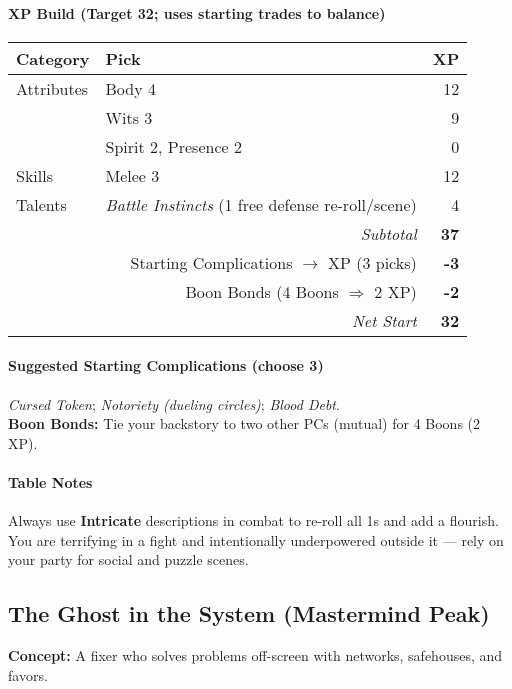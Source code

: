 \documentclass[11pt]{book}
\begin{document}
\paragraph{XP Build (Target 32; uses starting trades to balance)}
\begin{tabular}{@{}llr@{}}
\toprule
\textbf{Category} & \textbf{Pick} & \textbf{XP} \\
\midrule
Attributes & Body 4 & 12 \\
           & Wits 3 & 9 \\
           & Spirit 2, Presence 2 & 0 \\
Skills     & Melee 3 & 12 \\
Talents    & \emph{Battle Instincts} (1 free defense re-roll/scene) & 4 \\
\midrule
\multicolumn{2}{r}{\textit{Subtotal}} & \textbf{37} \\
\multicolumn{2}{r}{Starting Complications $\rightarrow$ XP (3 picks)} & \textbf{-3} \\
\multicolumn{2}{r}{Boon Bonds (4 Boons $\Rightarrow$ 2 XP)} & \textbf{-2} \\
\midrule
\multicolumn{2}{r}{\textit{Net Start}} & \textbf{32} \\
\bottomrule
\end{tabular}

\paragraph{Suggested Starting Complications (choose 3)}
\emph{Cursed Token}; \emph{Notoriety (dueling circles)}; \emph{Blood Debt}.\\
\textbf{Boon Bonds:} Tie your backstory to two other PCs (mutual) for 4 Boons (2 XP).

\paragraph{Table Notes}
Always use \textbf{Intricate} descriptions in combat to re-roll all 1s and add a flourish. You are terrifying in a fight and intentionally underpowered outside it — rely on your party for social and puzzle scenes.

\bigskip

\subsection*{The Ghost in the System (Mastermind Peak)}
\textbf{Concept:} A fixer who solves problems off-screen with networks, safehouses, and favors.
\end{document}
